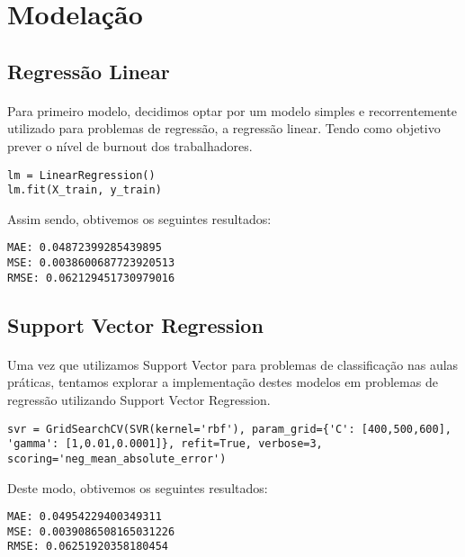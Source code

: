\section{Modelação}

\subsection{Regressão Linear}
\paragraph{}
Para primeiro modelo, decidimos optar por um modelo simples e recorrentemente utilizado para problemas de regressão, a regressão linear. Tendo como objetivo prever o nível de burnout dos trabalhadores.
\begin{verbatim}
lm = LinearRegression()
lm.fit(X_train, y_train)
\end{verbatim}

Assim sendo, obtivemos os seguintes resultados:
\begin{verbatim}
MAE: 0.04872399285439895
MSE: 0.0038600687723920513
RMSE: 0.062129451730979016
\end{verbatim}

\subsection{Support Vector Regression}
\paragraph{}
Uma vez que utilizamos Support Vector para problemas de classificação nas aulas práticas, tentamos explorar a implementação destes modelos em problemas de regressão utilizando Support Vector Regression.

\begin{verbatim}
svr = GridSearchCV(SVR(kernel='rbf'), param_grid={'C': [400,500,600], 'gamma': [1,0.01,0.0001]}, refit=True, verbose=3, scoring='neg_mean_absolute_error')
\end{verbatim}

Deste modo, obtivemos os seguintes resultados:
\begin{verbatim}
MAE: 0.04954229400349311
MSE: 0.0039086508165031226
RMSE: 0.06251920358180454
\end{verbatim}

